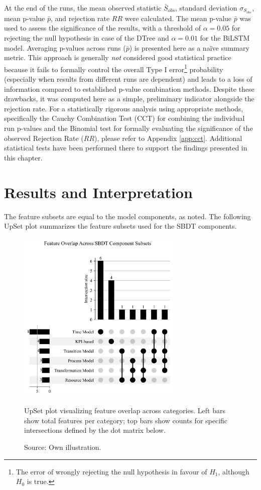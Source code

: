 At the end of the runs, the mean observed statistic $\bar{S}_{obs}$, standard deviation $\sigma_{S_{obs}}$, mean p-value $\bar{p}$, and rejection rate $RR$ were calculated. The mean p-value $\bar{p}$ was used to assess the significance of the results, with a threshold of $\alpha = 0.05$ for rejecting the null hypothesis in case of the DTree and $\alpha = 0.01$ for the BiLSTM model. Averaging p-values across runs ($\bar{p}$) is presented here as a naïve summary metric. This approach is generally \textit{not} considered good statistical practice because it fails to formally control the overall Type I error\footnote{The error of wrongly rejecting the null hypothesis in favour of $H_1$, although $H_0$ is true.} probability (especially when results from different runs are dependent) and leads to a loss of information compared to established p-value combination methods. Despite these drawbacks, it was computed here as a simple, preliminary indicator alongside the rejection rate. For a statistically rigorous analysis using appropriate methods, specifically the Cauchy Combination Test (CCT) for combining the individual run p-values and the Binomial test for formally evaluating the significance of the observed Rejection Rate ($RR$), please refer to Appendix \ref{app:cct}. Additional statistical tests have been performed there to support the findings presented in this chapter.

\section{Results and Interpretation}
The feature subsets are equal to the model components, as noted. The following UpSet plot summarizes the feature subsets used for the SBDT components.

\begin{figure}[htbp]
  \centering
  \includegraphics[width=0.7\textwidth]{figures/upset.png}
  \caption[UpSet Plot]{UpSet plot visualizing feature overlap across categories. Left bars show total features per category; top bars show counts for specific intersections defined by the dot matrix below.}
  \caption*{Source: Own illustration.}
  \label{fig:upsetplot}
\end{figure}

